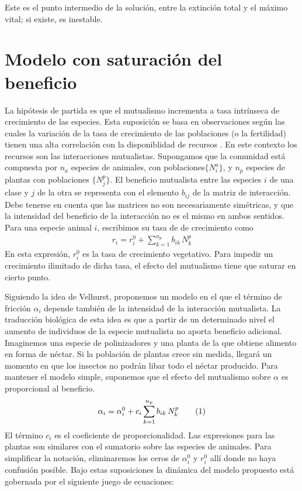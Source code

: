 Este es el punto intermedio de la solución, entre la extinción total y el máximo vital; si existe, es inestable.

\clearpage
\section{Modelo con saturación del beneficio}

La hipótesis de partida es que el mutualismo incrementa a tasa intrínseca de crecimiento de las especies. Esta suposición se basa en observaciones según las cuales la variación de la tasa de crecimiento de las poblaciones (o la fertilidad) tienen una alta correlación con la disponiblidad de recursos \cite{stenseth1998,krebs2002,rueness2003,tyler2008,jones2008}. En este contexto los recursos son las interacciones mutualistas. Supongamos que la comunidad está compuesta por $n_a$ especies de animales, con poblaciones$\{N_{i}^a\}$, y $n_p$ especies de plantas con poblaciones $\{N_{j}^p\}$. El beneficio mutualista entre las especies $i$  de una clase y $j$ de la otra se representa con el elemento $b_{ij}$ de la matriz de interacción. Debe tenerse en cuenta que las matrices no son necesariamente simétricas, y que la intensidad del beneficio de la interacción no es el mismo en ambos sentidos. Para una especie animal $i$, escribimos su tasa de de crecimiento como
\begin{align}
r_{i} = r_{i}^{0} + \sum_{k=1}^{n_{p}} b_{ik}\, N^{p}_k
\label{eq:expr}
\end{align}
En esta expresión, $r_{i}^{0}$ es la tasa de crecimiento vegetativo. Para impedir un crecimiento ilimitado de dicha tasa, el efecto del mutualismo tiene que saturar en cierto punto.

Siguiendo la idea de Velhurst, proponemos un modelo en el que el término de fricción $\alpha_i$ depende también de la intensidad de la interacción mutualista. La traducción biológica de esta idea es que a partir de un determinado nivel el aumento de individuos de la especie mutualista no aporta beneficio adicional. Imaginemos una especie de polinizadores y una planta de la que obtiene alimento en forma de néctar. Si la población de plantas crece sin medida, llegará un momento en que los insectos no podrán libar todo el néctar producido. Para mantener el modelo simple, suponemos que el efecto del mutualismo sobre $\alpha$ es proporcional al beneficio. 
\begin{align}
\alpha_i = \alpha_{i}^{0}+ c_{i} \sum_{k=1}^{n_{p}} b_{ik}\, N^{p}_k 
\stepcounter{equation}\tag{\theequation}
\label{eq:alphavariable}
\end{align}
El término $c_{i}$ es el coeficiente de proporcionalidad. Las expresiones para las plantas son similares con el sumatorio sobre las especies de animales. Para simplificar la notación, eliminaremos los ceros de $\alpha_{i}^{0}$ y $r_{i}^{0}$ allí donde no haya confusión posible. Bajo estas suposiciones la dinámica del modelo propuesto está gobernada por el siguiente juego de ecuaciones:

